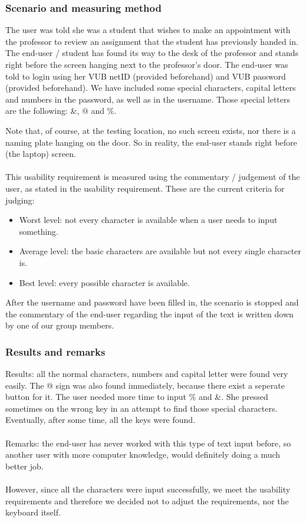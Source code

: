 \documentclass[11pt, a4paper,svglistings]{report}
\begin{document}
\subsubsection{Scenario and measuring method}

The user was told she was a student that wishes to make an appointment with the professor to review an assignment that the student has previously handed in. The end-user / student has found its way to the desk of the professor and stands right before the screen hanging next to the professor's door. The end-user was told to login using her VUB netID (provided beforehand) and VUB password (provided beforehand). We have included some special characters, capital letters and numbers in the password, as well as in the username. Those special letters are the following: \&, $@$ and \%.

Note that, of course, at the testing location, no such screen exists, nor there is a naming plate hanging on the door. So in reality, the end-user stands right before (the laptop) screen. \\ \\
This usability requirement is measured using the commentary / judgement of the user, as stated in the usability requirement. These are the current criteria for judging:
\begin{itemize}
\item{Worst level: not every character is available when a user needs to input something.}
\item{Average level: the basic characters are available but not every single character is.}
\item{Best level: every possible character is available.}
\end{itemize}
After the username and password have been filled in, the scenario is stopped and the commentary of the end-user regarding the input of the text is written down by one of our group members.

\subsubsection{Results and remarks}

Results: all the normal characters, numbers and capital letter were found very easily. The @ sign was also found immediately, because there exist a seperate button for it. The user needed more time to input \% and \&. She pressed sometimes on the wrong key in an attempt to find those special characters. Eventually, after some time, all the keys were found. \\ \\
Remarks: the end-user has never worked with this type of text input before, so another user with more computer knowledge, would definitely doing a much better job. \\ \\
However, since all the characters were input successfully, we meet the usability requirements and therefore we decided not to adjust the requirements, nor the keyboard itself. 
\end{document}
